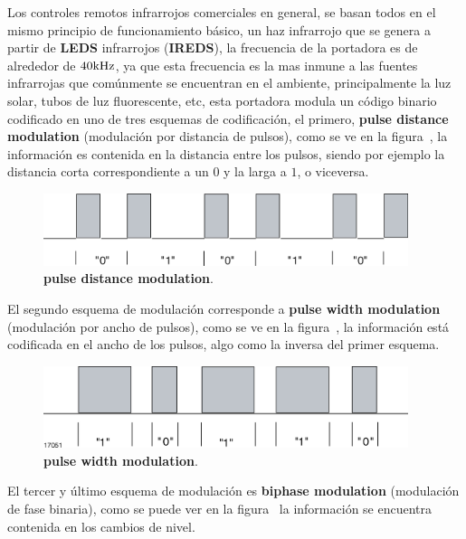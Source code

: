 
Los controles remotos infrarrojos comerciales en general, se basan todos en el mismo principio de funcionamiento básico, un haz infrarrojo que se genera a partir de \textbf{LEDS} infrarrojos (\textbf{IREDS}), la frecuencia de la portadora es de alrededor de $40 \si[per-mode=symbol]{\kilo\hertz}$, ya que esta frecuencia es la mas inmune a las fuentes infrarrojas que comúnmente se encuentran en el ambiente, principalmente la luz solar, tubos de luz fluorescente, etc, esta portadora modula un código binario codificado en uno de tres esquemas de codificación, el primero, \textbf{pulse distance modulation} (modulación por distancia de pulsos), como se ve en la figura~, la información es contenida en la distancia entre los pulsos, siendo por ejemplo la distancia corta correspondiente a un $0$ y la larga a $1$, o viceversa.

 

\begin{figure}[H]
	\centering
	\includegraphics[width=0.95\textwidth]{img/IR/pulse_distance.png}
	\caption{\footnotesize{\textbf{pulse distance modulation}.}}
	\label{fig:pulse_distance_modulation}
\end{figure}


El segundo esquema de modulación corresponde a \textbf{pulse width modulation} (modulación por ancho de pulsos), como se ve en la figura~, la información está codificada en el ancho de los pulsos, algo como la inversa del primer esquema.



\begin{figure}[H]
	\centering
	\includegraphics[width=0.95\textwidth]{img/IR/pulse_width.png}
	\caption{\footnotesize{\textbf{pulse width modulation}.}}
	\label{fig:pulse_width_modulation}
\end{figure}


El tercer y último esquema de modulación es \textbf{biphase modulation} (modulación de fase binaria), como se puede ver en la figura~ la información se encuentra contenida en los cambios de nivel.


